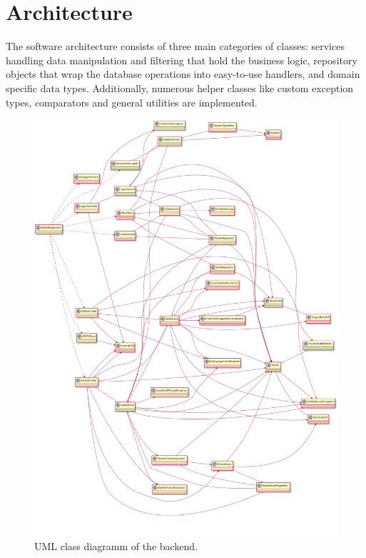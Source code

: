 \section{Architecture}
The software architecture consists of three main categories of classes: services handling data manipulation and filtering that hold the business logic, repository objects that wrap the database operations into easy-to-use handlers, and domain specific data types. Additionally, numerous helper classes like custom exception types, comparators and general utilities are implemented.
\begin{figure}[!htp]
    \centering
    \includegraphics[width=\textwidth]{images/uml.png}
    \caption[Backend Class Diagramm]{UML class diagramm of the backend.}
    \label{fig:markovchain}
\end{figure}

